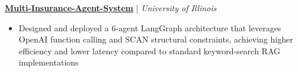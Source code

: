 \documentclass[10pt]{article}
\begin{document}
\noindent
\textbf{\href{https://www.linkedin.com/feed/update/urn:li:activity:7432941417351757825/?originTrackingId=CoH1QgnwmzoYsWrosFZCZQ\%3D\%3D}{Multi-Insurance-Agent-System}} | 
\emph{University of Illinois}
\vspace{-5pt}
\begin{itemize}[left=0pt, itemsep=0pt]
    \item Designed and deployed a 6-agent LangGraph architecture that leverages OpenAI function calling and SCAN structural constraints, achieving higher efficiency and lower latency compared to standard keyword-search RAG implementations
\end{itemize}


\end{document}
